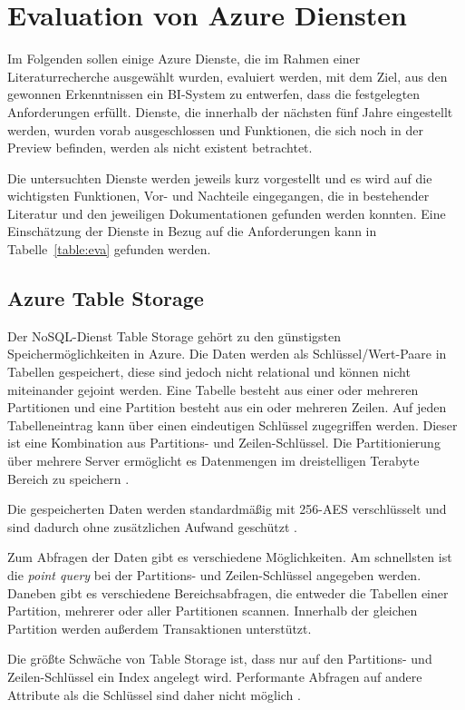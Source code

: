 \section{Evaluation von Azure Diensten} \label{sec:evaluation}
Im Folgenden sollen einige Azure Dienste, die im Rahmen einer Literaturrecherche ausgewählt wurden, evaluiert werden, mit dem Ziel, aus den gewonnen Erkenntnissen ein BI-System zu entwerfen, dass die festgelegten Anforderungen erfüllt. Dienste, die innerhalb der nächsten fünf Jahre eingestellt werden, wurden vorab ausgeschlossen und Funktionen, die sich noch in der Preview befinden, werden als nicht existent betrachtet. 

Die untersuchten Dienste werden jeweils kurz vorgestellt und es wird auf die wichtigsten Funktionen, Vor- und Nachteile eingegangen, die in bestehender Literatur und den jeweiligen Dokumentationen gefunden werden konnten. Eine Einschätzung der Dienste in Bezug auf die Anforderungen kann in Tabelle~\ref{table:eva} gefunden werden.

\subsection{Azure Table Storage} \label{sec:grundlagen:azure_dienste:tableStorage}
Der NoSQL-Dienst Table Storage gehört zu den günstigsten Speichermöglichkeiten in Azure. Die Daten werden als Schlüssel/Wert-Paare in Tabellen gespeichert, diese sind jedoch nicht relational und können nicht miteinander gejoint werden. Eine Tabelle besteht aus einer oder mehreren Partitionen und eine Partition besteht aus ein oder mehreren Zeilen. Auf jeden Tabelleneintrag kann über einen eindeutigen Schlüssel zugegriffen werden. Dieser ist eine Kombination aus Partitions- und Zeilen-Schlüssel. Die Partitionierung über mehrere Server ermöglicht es Datenmengen im dreistelligen Terabyte Bereich zu speichern \cite{reagan_web_2018}.

Die gespeicherten Daten werden standardmäßig mit 256-AES verschlüsselt und sind dadurch ohne zusätzlichen Aufwand geschützt \cite{soh_microsoft_2020}. 

Zum Abfragen der Daten gibt es verschiedene Möglichkeiten. Am schnellsten ist die \textit{point query} bei der Partitions- und Zeilen-Schlüssel angegeben werden. Daneben gibt es verschiedene Bereichsabfragen, die entweder die Tabellen einer Partition, mehrerer oder aller Partitionen scannen. Innerhalb der gleichen Partition werden außerdem Transaktionen unterstützt. 

Die größte Schwäche von Table Storage ist, dass nur auf den Partitions- und Zeilen-Schlüssel ein Index angelegt wird. Performante Abfragen auf andere Attribute als die Schlüssel sind daher nicht möglich \cite{reagan_web_2018}.

